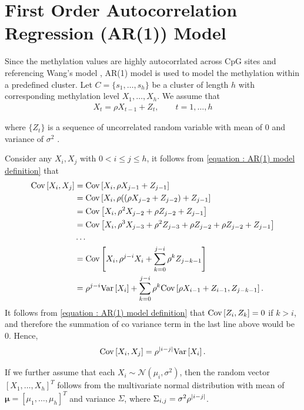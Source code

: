 \documentclass{report}
\begin{document}
\section{First Order Autocorrelation Regression (AR(1)) Model} \label{section : AR(1) model}
\par
 Since the methylation values are highly autocorrlated across CpG sites \cite{eckhardt2006dna} and referencing Wang's model \cite{wang2017accounting}, AR(1) model is used to model the methylation within a predefined cluster.
 Let $C = \{s_1,\ldots,s_h\}$ be a cluster of length $h$ with corresponding methylation level $X_1,\ldots, X_h$. We assume that
 \begin{align} \label{equation : AR(1) model definition}
    X_t = \rho X_{t-1} + Z_t, \qquad t = 1,\ldots,h
 \end{align}
     
where $\{Z_t\}$ is a sequence of uncorrelated random variable with mean of $0$ and variance of $\sigma^2$ \cite{brockwell2002introduction}.
\par
Consider any $X_i, X_j$ with $0 <i \leq j \leq h$, it follows from \eqref{equation : AR(1) model definition} that
\begin{align*}
    \Cov{ X_i, X_j} &= \Cov{X_i, \rho X_{j-1} + Z_{j-1} }
    \\
    &= \Cov{X_i, \rho( (\rho X_{j-2} + Z_{j-2}) + Z_{j-1} }
    \\
    &= \Cov{X_i, \rho^2X_{j-2} + \rho Z_{j-2} +  Z_{j-1}  }
    \\
    &= \Cov{X_i, \rho^3X_{j-3} + \rho^2 Z_{j-3} + \rho Z_{j-2} + \rho Z_{j-2} + Z_{j-1}  }
    \\
    &\ldots
    \\
    &= \Cov{X_i, \rho^{j-i}X_{i} + \sumk[0]{j-i} \rho^{k} Z_{j-k-1} }
    \\
    &= \rho^{j-i} \Var{X_i} + \sumk[0]{j-i} \rho^{k} \Cov{\rho X_{i-1} + Z_{i-1},Z_{j-k-1}}.
\end{align*}
It follows from \eqref{equation : AR(1) model definition} that $\Cov{Z_i, Z_k} =0$ if $k>i$, and
therefore the summation of co variance term in the last line above would be $0$. Hence,
\[ 
    \Cov{ X_i, X_j} = \rho^{\abs{i-j}} \Var{X_i}.
\]
\par
If we  further assume that each $X_i \sim \mathcal{N}(\mu_i, \sigma^2)$, then the random vector $[X_1,\ldots,X_h]^T$ follows
from the multivariate normal distribution with mean of $\boldsymbol{\mu} = [\mu_1,\ldots,\mu_h]^T$ and variance $\Sigma$, where $\Sigma_{i,j} = \sigma^2 \rho ^{\abs{i-j}}$.
\end{document}
